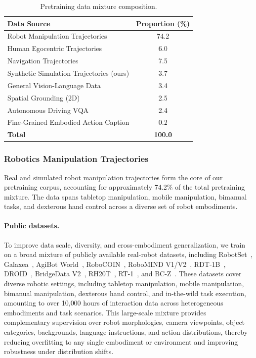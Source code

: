 \documentclass{llmxive}
\begin{document}
\begin{table}[!htbp]
\centering
\begin{tabular}{lc}
\toprule
\textbf{Data Source} & \textbf{Proportion (\%)} \\
\midrule
Robot Manipulation Trajectories      & 74.2 \\
Human Egocentric Trajectories                & 6.0  \\
Navigation Trajectories                     & 7.5  \\
Synthetic Simulation Trajectories (ours)            & 3.7  \\
General Vision-Language Data         & 3.4  \\
Spatial Grounding (2D)               & 2.5  \\
Autonomous Driving VQA               & 2.4  \\
Fine-Grained Embodied Action Caption & 0.2  \\
\midrule
\textbf{Total}                       & \textbf{100.0} \\
\bottomrule
\end{tabular}
\caption{Pretraining data mixture composition.}
\label{tab:data}
\end{table}

\subsubsection{Robotics Manipulation Trajectories}

Real and simulated robot manipulation trajectories form the core of our
pretraining corpus, accounting for approximately 74.2\% of the total
pretraining mixture. The data spans tabletop manipulation, mobile manipulation,
bimanual tasks, and dexterous hand control across a diverse set of robot
embodiments.

\paragraph{Public datasets.}

To improve data scale, diversity, and cross-embodiment generalization, we train
on a broad mixture of publicly available real-robot datasets, including
RobotSet~\citep{RoboSet}, Galaxea~\citep{galaxea_g0},
AgiBot World~\citep{agibot_world_colosseo}, RoboCOIN~\citep{robocoin},
RoboMIND V1/V2~\citep{robomind_v1,robomind_v2}, RDT-1B~\citep{RDT-1B},
DROID~\citep{droid}, BridgeData V2~\citep{bridgev2},
RH20T~\citep{RH20T}, RT-1~\citep{rt1}, and BC-Z~\citep{bc_z}.
These datasets cover diverse robotic settings, including tabletop
manipulation, mobile manipulation, bimanual manipulation, dexterous hand
control, and in-the-wild task execution, amounting to over 10{,}000 hours of
interaction data across heterogeneous embodiments and task scenarios. This
large-scale mixture provides complementary supervision over robot morphologies,
camera viewpoints, object categories, backgrounds, language instructions, and
action distributions, thereby reducing overfitting to any single embodiment or
environment and improving robustness under distribution shifts.
\end{document}
